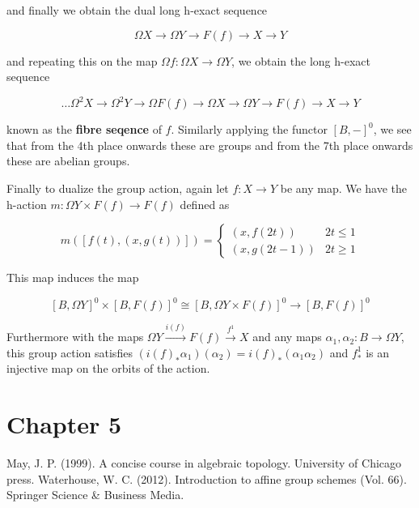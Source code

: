 \documentclass[12pt]{article}
\begin{document}
and finally we obtain the dual long h-exact sequence

\[\Omega X\to\Omega Y\to F(f)\to X\to Y\]

and repeating this on the map $\Omega f:\Omega X\to\Omega Y$, we obtain the long h-exact sequence

\[\dots\Omega^2X\to\Omega^2Y\to\Omega F(f)\to\Omega X\to\Omega Y\to F(f)\to X\to Y\]

known as the \textbf{fibre seqence} of $f$. Similarly applying the functor $\left[B,-\right]^0$, we see that from the 4th place onwards these are groups and from the 7th place onwards these are abelian groups.

Finally to dualize the group action, again let $f:X\to Y$ be any map. We have the h-action $m:\Omega Y\times F(f)\to F(f)$ defined as

\[m\left(\left[f(t),\left(x,g(t)\right)\right]\right)=\begin{cases}\left(x,f(2t)\right)&2t\leq1\\\left(x,g(2t-1)\right)&2t\geq1\end{cases}\]

This map induces the map

\[\left[B,\Omega Y\right]^0\times\left[B,F(f)\right]^0\cong\left[B,\Omega Y\times F(f)\right]^0\to\left[B,F(f)\right]^0\]

Furthermore with the maps $\Omega Y\overset{i(f)}\to F(f)\overset{f^1}\to X$ and any maps $\alpha_1,\alpha_2:B\to\Omega Y$, this group action satisfies $\left(i(f)_*\alpha_1\right)\left(\alpha_2\right)=i(f)_*\left(\alpha_1\alpha_2\right)$ and $f^1_*$ is an injective map on the orbits of the action.

\section{Chapter 5}

\begin{thebibliography}{99}
     May, J. P. (1999). A concise course in algebraic topology. University of Chicago press.
     Waterhouse, W. C. (2012). Introduction to affine group schemes (Vol. 66). Springer Science \& Business Media.
\end{thebibliography}
\end{document}
